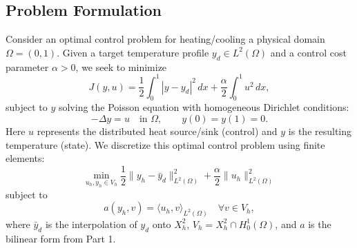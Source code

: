 \documentclass[a4paper,10pt]{article}
\begin{document}
\subsection{Problem Formulation}

Consider an optimal control problem for heating/cooling a physical domain \(\Omega=(0,1)\).
Given a target temperature profile \(y_d \in L^2(\Omega)\) and a control cost parameter \(\alpha > 0\), we seek to minimize
\[
	J(y,u) = \frac{1}{2}\int_0^1 |y-y_d|^2\,dx + \frac{\alpha}{2}\int_0^1 u^2\,dx,
\]
subject to \(y\) solving the Poisson equation with homogeneous Dirichlet conditions:
\[
	-\Delta y = u \quad\text{in }\Omega, \qquad y(0) = y(1) = 0.
\]
Here \(u\) represents the distributed heat source/sink (control) and \(y\) is the resulting temperature (state).
We discretize this optimal control problem using finite elements:
\[
	\min_{u_h,y_h\in V_h} \frac{1}{2}\|y_h - \bar{y}_d\|^2_{L^2(\Omega)} + \frac{\alpha}{2}\|u_h\|^2_{L^2(\Omega)}
\]
subject to
\[
	a(y_h,v) = \langle u_h,v \rangle_{L^2(\Omega)} \quad \forall v\in V_h,
\]
where \(\bar{y}_d\) is the interpolation of \(y_d\) onto \(X^2_h\), \(V_h = X^2_h \cap H^1_0(\Omega)\), and \(a\) is the bilinear form from Part 1.
\end{document}
